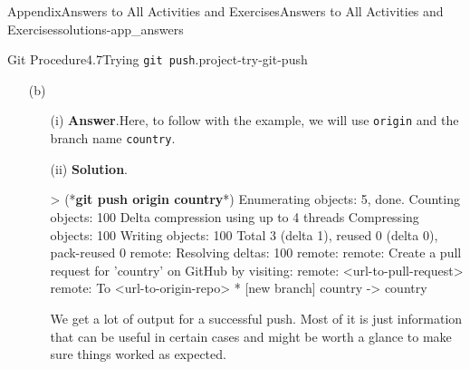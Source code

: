 \documentclass[oneside,10pt,]{book}
\newcommand{\blocktitlefont}{\relax}
\newcommand{\mono}[1]{\texttt{#1}}
\newcommand{\consoleinput}[1]{\textbf{#1}}
\begin{document}
\begin{solutions-chapter}{Appendix}{Answers to All Activities and Exercises}{}{Answers to All Activities and Exercises}{}{}{solutions-app_answers}
\begin{projectsolution}{Git Procedure}{4.7}{Trying \mono{git push}.}{project-try-git-push}
\begin{enumerate}[font=\bfseries,label=(\alph*),ref=\alph*]
\begin{enumerate}[font=\bfseries,label=(\roman*),ref=\theenumi.\roman*]
\begin{console}{0}{1}{0}
    git push --set-upstream origin country
\end{console}
Well, look at that, the same error. This should make sense. You are telling Git to push changes to the origin repo but \mono{country}, the current branch, doesn't have an origin since we created the branch locally.%
\item[(iii)]\noindent\textbf{\blocktitlefont Solution}.\hypertarget{solution-try-git-push-c-d-b-back}{}\quad{}\begin{console}{0}{1}{0}
> (*\consoleinput{git push country}*)
fatal: 'country' does not appear to be a git repository
fatal: Could not read from remote repository.

Please make sure you have the correct access rights
and the repository exists.
\end{console}
Remember the four parts to \mono{git push}? Well since we forgot Step 3, the remote name, Git assumes that the word ``country'' is the name of the repo we want to push to. Since there is no repo named ``country'' on your computer nor on GitHub, it doens't know where to push and errors out.%
\end{enumerate}%
\item[(b)]\begin{enumerate}[font=\bfseries,label=(\roman*),ref=\theenumi.\roman*]%
\item[(i)]\noindent\textbf{\blocktitlefont Answer}.\hypertarget{answer-try-git-push-d-b-b-back}{}\quad{}Here, to follow with the example, we will use \mono{origin} and the branch name \mono{country}.%
\item[(ii)]\noindent\textbf{\blocktitlefont Solution}.\hypertarget{solution-try-git-push-d-c-b-back}{}\quad{}\begin{console}{0}{1}{0}
> (*\consoleinput{git push origin country}*)
Enumerating objects: 5, done.
Counting objects: 100%
Delta compression using up to 4 threads
Compressing objects: 100%
Writing objects: 100%
Total 3 (delta 1), reused 0 (delta 0), pack-reused 0
remote: Resolving deltas: 100%
remote: 
remote: Create a pull request for 'country' on GitHub by visiting:
remote:      <url-to-pull-request>
remote: 
To <url-to-origin-repo>
 * [new branch]      country -> country
\end{console}
We get a lot of output for a successful push. Most of it is just information that can be useful in certain cases and might be worth a glance to make sure things worked as expected.%

\end{enumerate}
\end{enumerate}
\end{projectsolution}
\end{solutions-chapter}
\end{document}
